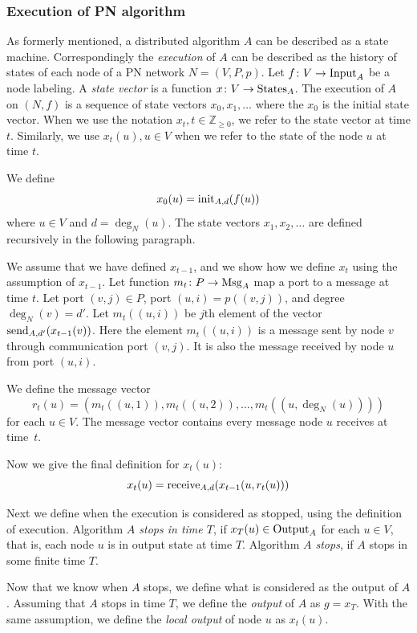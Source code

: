 \subsubsection{Execution of PN algorithm}

As formerly mentioned, a distributed algorithm $A$ can be described as a state machine.
Correspondingly the \emph{execution} of $A$ can be described as the history of states of each node of a PN network $N=(V, P, p)$.
Let $f\colon V \rightarrow \operatorname{Input}_A$ be a node labeling.
A \emph{state vector} is a function $x\colon V \rightarrow \operatorname{States}_A$.
The execution of $A$ on $(N, f)$ is a sequence of state vectors $x_0, x_1, \dotsc$ where the $x_0$ is the initial state vector.
When we use the notation $x_t, t \in \mathbb{Z}_{\geq 0}$, we refer to the state vector at time $t$.
Similarly, we use $x_t(u), u \in V$ when we refer to the state of the node $u$ at time $t$.

We define $$x_0(u) = \operatorname{init}_{A,d}(f(u))$$ where $u\in V$ and $d=\deg_N(u)$.
The state vectors $x_1, x_2, \dotsc$ are defined recursively in the following paragraph.

We assume that we have defined $x_{t-1}$, and we show how we define $x_{t}$ using the assumption of $x_{t-1}$.
Let function $m_t\colon P \rightarrow \operatorname{Msg}_A$ map a port to a message at time $t$.
Let port $(v, j) \in P$, port $(u, i) = p((v, j))$, and degree $\deg_N(v) = d'$.
Let $m_t((u, i))$ be $j$th element of the vector $\operatorname{send}_{A, d'}(x_{t-1}(v))$.
Here the element $m_t((u, i))$ is a message sent by node $v$ through communication port $(v, j)$.
It is also the message received by node $u$ from port $(u, i)$.

We define the message vector $$r_t(u)=(m_t((u, 1)), m_t((u, 2)), \dotsc, m_t((u, \deg_N(u))))$$ for each $u\in V$.
The message vector contains every message node $u$ receives at time~$t$.

Now we give the final definition for $x_t(u)$:
$$x_t(u) = \operatorname{receive}_{A,d}(x_{t-1}(u, r_t(u)))$$

Next we define when the execution is considered as stopped, using the definition of execution.
Algorithm \emph{$A$ stops in time $T$}, if $x_T(u) \in \operatorname{Output}_A$ for each $u \in V$, that is, each node $u$ is in output state at time $T$.
Algorithm \emph{$A$ stops}, if $A$ stops in some finite time $T$.


Now that we know when $A$ stops, we define what is considered as the output of $A$.
Assuming that $A$ stops in time $T$, we define the \emph{output} of $A$ as $g=x_T$.
With the same assumption, we define the \emph{local output} of node $u$ as $x_t(u)$.



